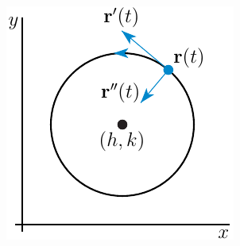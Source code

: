 \begin{eg}
\begin{efig}
\begin{center}
     \includegraphics{circleVA.pdf}
\end{center}
\end{efig}
\end{eg}


